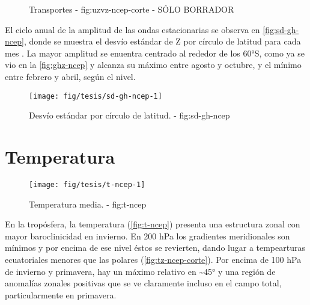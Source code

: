 \documentclass[spanish,a4paper]{book}
\begin{document}
\begin{figure}
\newline{}\caption{Transportes - fig:uzvz-ncep-corte - SÓLO BORRADOR}\label{fig:uzvz-ncep-corte}
\end{figure}

El ciclo anual de la amplitud de las ondas estacionarias se observa en
\autoref{fig:sd-gh-ncep}, donde se muestra el desvío estándar de Z por
círculo de latitud para cada mes
. La
mayor amplitud se enuentra centrado al rededor de los 60°S, como ya se
vio en la \autoref{fig:ghz-ncep} y alcanza su máximo entre agosto y
octubre, y el mínimo entre febrero y abril, según el nivel.

\begin{figure}

{\centering \texttt{[image: fig/tesis/sd-gh-ncep-1]} 

}

\caption{Desvío estándar por círculo de latitud. - fig:sd-gh-ncep}\label{fig:sd-gh-ncep}
\end{figure}

\section{Temperatura}\label{temperatura}

\begin{figure}

{\centering \texttt{[image: fig/tesis/t-ncep-1]} 

}

\caption{Temperatura media. - fig:t-ncep}\label{fig:t-ncep}
\end{figure}

En la tropósfera, la temperatura (\autoref{fig:t-ncep}) presenta una
estructura zonal con mayor baroclinicidad en invierno. En 200 hPa los
gradientes meridionales son mínimos y por encima de ese nivel éstos se
revierten, dando lugar a tempearturas ecuatoriales menores que las
polares (\autoref{fig:tz-ncep-corte}). Por encima de 100 hPa de invierno
y primavera, hay un máximo relativo en \textasciitilde{}45°
 y una región de anomalías zonales positivas que se ve
claramente incluso en el campo total, particularmente en primavera.
\end{document}
